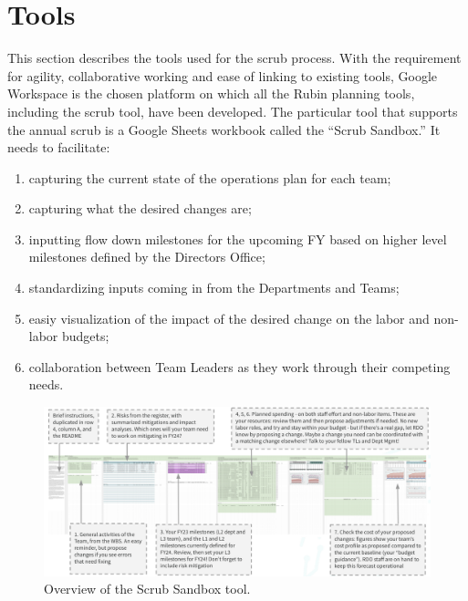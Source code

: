 \section{Tools} \label{sec:tools}

This section describes the tools used for the scrub process. 
With the requirement for agility, collaborative working and ease of linking to existing tools, Google Workspace is the chosen platform on which all the Rubin planning tools, including the scrub tool, have been developed. 
The particular tool that supports the annual scrub is a Google Sheets workbook called the ``Scrub Sandbox.''
It needs to facilitate:
\begin{enumerate}
\item capturing the current state of the operations plan for each team;
\item capturing what the desired changes are;
\item inputting flow down milestones for the upcoming FY based on higher level milestones defined by the Directors Office;
\item standardizing inputs coming in from the Departments and Teams;
\item easiy visualization of the impact of the desired change on the labor and non-labor budgets;
\item collaboration between Team Leaders as they work through their competing needs.
\end{enumerate}

\begin{figure}[h!]
\begin{centering}
\includegraphics[width=1.0\textwidth]{Figure3OverviewScrubSandbox}
	\caption{ Overview of the Scrub Sandbox tool.
\label{fig:sandbox}}
\end{centering}
\end{figure}

